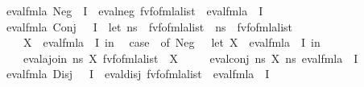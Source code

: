 \begin{isabellebody}
{\isacharbar}{\kern0pt}\ {\isachardoublequoteopen}eval{\isacharunderscore}{\kern0pt}fmla\ {\isacharparenleft}{\kern0pt}Neg\ {\isasymphi}{\isacharparenright}{\kern0pt}\ I\ {\isacharequal}{\kern0pt}\ eval{\isacharunderscore}{\kern0pt}neg\ {\isacharparenleft}{\kern0pt}fv{\isacharunderscore}{\kern0pt}fo{\isacharunderscore}{\kern0pt}fmla{\isacharunderscore}{\kern0pt}list\ {\isasymphi}{\isacharparenright}{\kern0pt}\ {\isacharparenleft}{\kern0pt}eval{\isacharunderscore}{\kern0pt}fmla\ {\isasymphi}\ I{\isacharparenright}{\kern0pt}{\isachardoublequoteclose}\isanewline
{\isacharbar}{\kern0pt}\ {\isachardoublequoteopen}eval{\isacharunderscore}{\kern0pt}fmla\ {\isacharparenleft}{\kern0pt}Conj\ {\isasymphi}\ {\isasympsi}{\isacharparenright}{\kern0pt}\ I\ {\isacharequal}{\kern0pt}\ {\isacharparenleft}{\kern0pt}let\ ns{\isasymphi}\ {\isacharequal}{\kern0pt}\ fv{\isacharunderscore}{\kern0pt}fo{\isacharunderscore}{\kern0pt}fmla{\isacharunderscore}{\kern0pt}list\ {\isasymphi}{\isacharsemicolon}{\kern0pt}\ ns{\isasympsi}\ {\isacharequal}{\kern0pt}\ fv{\isacharunderscore}{\kern0pt}fo{\isacharunderscore}{\kern0pt}fmla{\isacharunderscore}{\kern0pt}list\ {\isasympsi}{\isacharsemicolon}{\kern0pt}\isanewline
\ \ \ \ X{\isasymphi}\ {\isacharequal}{\kern0pt}\ eval{\isacharunderscore}{\kern0pt}fmla\ {\isasymphi}\ I\ in\isanewline
\ \ case\ {\isasympsi}\ of\ Neg\ {\isasympsi}{\isacharprime}{\kern0pt}\ {\isasymRightarrow}\ let\ X{\isasympsi}{\isacharprime}{\kern0pt}\ {\isacharequal}{\kern0pt}\ eval{\isacharunderscore}{\kern0pt}fmla\ {\isasympsi}{\isacharprime}{\kern0pt}\ I\ in\isanewline
\ \ \ \ eval{\isacharunderscore}{\kern0pt}ajoin\ ns{\isasymphi}\ X{\isasymphi}\ {\isacharparenleft}{\kern0pt}fv{\isacharunderscore}{\kern0pt}fo{\isacharunderscore}{\kern0pt}fmla{\isacharunderscore}{\kern0pt}list\ {\isasympsi}{\isacharprime}{\kern0pt}{\isacharparenright}{\kern0pt}\ X{\isasympsi}{\isacharprime}{\kern0pt}\isanewline
\ \ {\isacharbar}{\kern0pt}\ {\isacharunderscore}{\kern0pt}\ {\isasymRightarrow}\ eval{\isacharunderscore}{\kern0pt}conj\ ns{\isasymphi}\ X{\isasymphi}\ ns{\isasympsi}\ {\isacharparenleft}{\kern0pt}eval{\isacharunderscore}{\kern0pt}fmla\ {\isasympsi}\ I{\isacharparenright}{\kern0pt}{\isacharparenright}{\kern0pt}{\isachardoublequoteclose}\isanewline
{\isacharbar}{\kern0pt}\ {\isachardoublequoteopen}eval{\isacharunderscore}{\kern0pt}fmla\ {\isacharparenleft}{\kern0pt}Disj\ {\isasymphi}\ {\isasympsi}{\isacharparenright}{\kern0pt}\ I\ {\isacharequal}{\kern0pt}\ eval{\isacharunderscore}{\kern0pt}disj\ {\isacharparenleft}{\kern0pt}fv{\isacharunderscore}{\kern0pt}fo{\isacharunderscore}{\kern0pt}fmla{\isacharunderscore}{\kern0pt}list\ {\isasymphi}{\isacharparenright}{\kern0pt}\ {\isacharparenleft}{\kern0pt}eval{\isacharunderscore}{\kern0pt}fmla\ {\isasymphi}\ I{\isacharparenright}{\kern0pt}\isanewline

\end{isabellebody}
